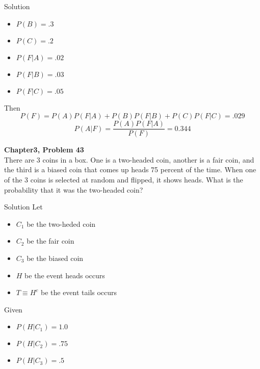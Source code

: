 \documentclass{article}
\begin{document}
\begin{spacing}{1.1}
\begin{homeworkProblem}
\begin{homeworkSection}{Solution}
\begin{itemize}
      \item $P( B) = .3$
      \item $P( C) = .2$
      \item $P( F|A) = .02$
      \item $P( F|B) = .03$
      \item $P( F|C) = .05$
    \end{itemize}
    Then
      \[P( F) = P( A)P( F|A) + P( B)P( F|B) + P( C)P( F|C) = .029\]
      \[P( A|F)= \frac{ P( A)P( F|A)}{ P( F)} = 0.344\]
  \end{homeworkSection}
\end{homeworkProblem}
\newpage
\begin{homeworkProblem}
  {\bf Chapter3, Problem 43}\\
  There are 3 coins in a box. One is a two-headed coin, another is a fair coin, 
  and the third is a biased coin that comes up heads 75 percent of the time. 
  When one of the 3 coins is selected at random and flipped, it shows heads. 
  What is the probability that it was the two-headed coin? 

  \begin{homeworkSection}{Solution}
     Let
    \begin{itemize}
      \item $C_1$ be the two-heded coin
      \item $C_2$ be the fair coin
      \item $C_3$ be the biased coin
      \item $H$ be the event heads occurs
      \item $T \equiv H^c$ be the event tails occurs
    \end{itemize}
    Given
    \begin{itemize}
      \item $P( H|C_1) = 1.0$
      \item $P( H|C_2) = .75$
      \item $P( H|C_3) = .5$
    \end{itemize}


\end{homeworkSection}
\end{homeworkProblem}
\end{spacing}
\end{document}
